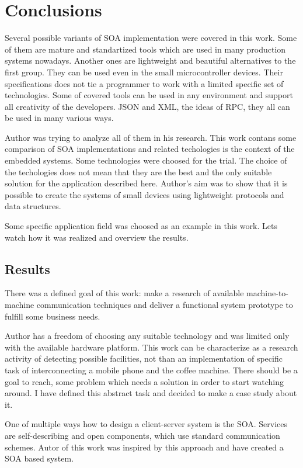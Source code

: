 \newpage
\section{Conclusions}

Several possible variants of \gls{SOA} implementation were covered in this work.
Some of them are mature and standartized tools which are used in many production
systems nowadays.
Another ones are lightweight and beautiful alternatives to the first group. They
can be  used even in the small microcontroller devices. 
Their specifications does not tie a programmer to work with a limited specific
set of technologies. 
Some of covered tools can be used in any environment and support all creativity
of the developers. 
JSON and XML, the ideas of RPC, they all can be used in many various ways.

Author was trying to analyze all of them in his research.
This work contans some comparison of SOA implementations and related techologies
is the context of the embedded systems.
Some technologies were choosed for the trial.
The choice of the techologies  does not mean that they are the best and the
only suitable solution for the application described here.
Author's  aim was to show that it is possible to create the systems of small
devices using lightweight protocols and data structures.

Some specific application field was choosed as an example in this work.
Lets watch how it was realized and overview the results.

\subsection{Results}

There was a defined goal of this work: make a research of available
machine-to-machine communication techniques and deliver a functional system
prototype to fulfill some business needs.

Author has a freedom of choosing any suitable technology and was limited only
with the available hardware platform. 
This work can be characterize as a research activity of detecting possible
facilities, not than an implementation of specific task of interconnecting
a mobile phone and the coffee machine.
There should be a goal to reach, some problem which needs a solution in order to
start watching around. 
I have defined this abstract task and decided to make a
case study about it.

One of multiple ways how to design a client-server system is the
\gls{SOA}. Services are self-describing and open components, which use standard
communication schemes. 
Autor of this work was inspired by this approach and have created a SOA
based system.


